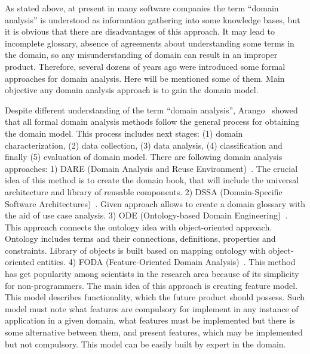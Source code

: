 \documentclass[conference]{IEEEtran}
\begin{document}
As stated above, at present in many software companies the term ``domain analysis'' is understood as information gathering into some knowledge bases, but it is obvious that there are disadvantages of this approach. It may lead to incomplete glossary, absence of agreements about understanding some terms in the domain, so any misunderstanding of domain can result in an improper product. Therefore, several dozens of years ago were introduced some formal approaches for domain analysis. Here will be mentioned some of them. Main objective any domain analysis approach is to gain the domain model.  


Despite different understanding of the term ``domain analysis'', Arango~\cite{arango1994domain} showed that all formal domain analysis methods follow the general process for obtaining the domain model. This process includes next stages: (1) domain characterization, (2) data collection, (3) data analysis, (4) classification and finally (5) evaluation of domain model. There are following domain analysis approaches: 1) DARE (Domain Analysis and Reuse Environment)~\cite{frakes1998dare}. The crucial idea of this method is to create the domain book, that will include the universal architecture and library of reusable components. 2) DSSA (Domain-Specific Software Architectures)~\cite{taylor1995software}. Given approach allows to create a domain glossary with the aid of use case analysis. 3) ODE (Ontology-based Domain Engineering)~\cite{falbo2002ontological}. This approach connects the ontology idea with object-oriented approach. Ontology includes  terms and their connections, definitions, properties and constraints. Library of objects is built based on mapping ontology with object-oriented entities. 4) FODA (Feature-Oriented Domain Analysis)~\cite{kang1990feature}. This method has get popularity among scientists in the research area because of its simplicity for non-programmers. The main idea of this approach is creating feature model. This model describes functionality, which the future product should possess. Such model must note what features are compulsory for implement in any instance of application in a given domain, what features must be implemented but there is some alternative between them, and present features, which may be implemented but not compulsory. This model can be easily built by expert in the domain. 
\end{document}
